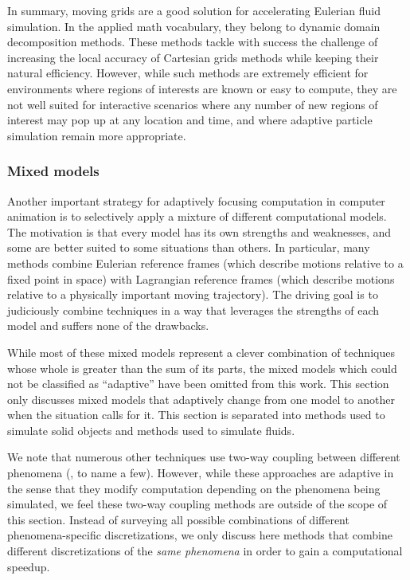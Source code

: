 In summary, moving grids are a good solution for accelerating Eulerian fluid simulation. In the applied math vocabulary, they belong to dynamic domain decomposition methods.
These methods tackle with success the challenge of increasing the local accuracy of Cartesian grids methods while keeping their natural efficiency. However, while such methods are extremely efficient for environments where regions of interests are known or easy to compute, they are not well suited for interactive scenarios where any number of new regions of interest may pop up at any location and time, and where adaptive particle simulation remain more appropriate.

\subsubsection{Mixed models}
\label{sec:mixed-models}

Another important strategy for adaptively focusing computation in computer animation is to selectively apply a mixture of different computational models. The motivation is that every model has its own strengths and weaknesses, and some are better suited to some situations than others. In particular, many methods combine Eulerian reference frames (which describe motions relative to a fixed point in space) with Lagrangian reference frames (which describe motions relative to a physically important moving trajectory). The driving goal is to judiciously combine techniques in a way that leverages the strengths of each model and suffers none of the drawbacks.

While most of these mixed models represent a clever combination of techniques whose whole is greater than the sum of its parts, the mixed models which could not be classified as ``adaptive'' have been omitted from this work. This section only discusses mixed models that adaptively change from one model to another when the situation calls for it.
This section is separated into methods used to simulate solid objects and methods used to simulate fluids.

We note that numerous other techniques use two-way coupling between different phenomena (\hspace{1sp}\cite{carlson2004rigid,robinson2008two,shinar2008two,Remillard2013}, to name a few). However, while these approaches are adaptive in the sense that they modify computation depending on the phenomena being simulated, we feel these two-way coupling methods are outside of the scope of this section. Instead of surveying all possible combinations of different phenomena-specific discretizations, we only discuss here methods that combine different discretizations of the {\em same phenomena} in order to gain a computational speedup.

